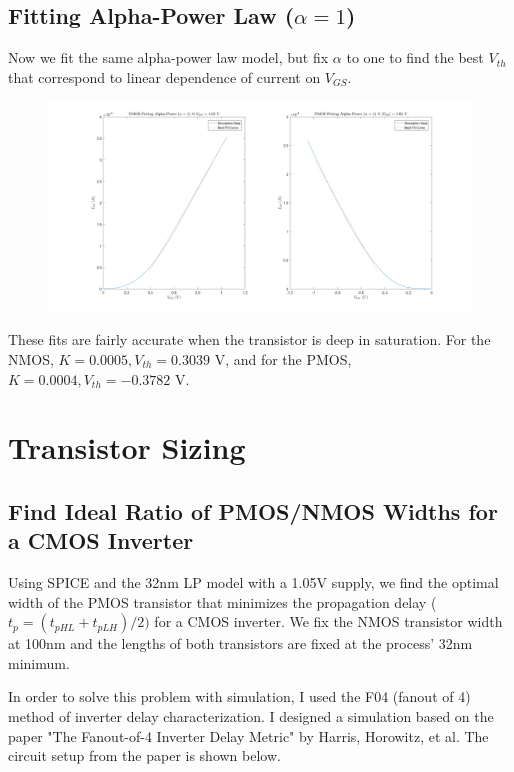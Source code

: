 \documentclass[11pt]{article}
\begin{document}
\subsection{Fitting Alpha-Power Law ($\alpha = 1$)}
Now we fit the same alpha-power law model, but fix $\alpha$ to one to find the best $V_{th}$ that correspond to linear dependence of current on $V_{GS}$.

\begin{figure}[H]
	\centerline{\includegraphics[width=\textwidth]{images/alpha_power_fit_alpha1.png}}
\end{figure}

These fits are fairly accurate when the transistor is deep in saturation. For the NMOS, $K = 0.0005, V_{th} = 0.3039 \text{ V}$, and for the PMOS, $K = 0.0004, V_{th} = -0.3782 \text{ V}$.

\section{Transistor Sizing}

\subsection{Find Ideal Ratio of PMOS/NMOS Widths for a CMOS Inverter}
Using SPICE and the 32nm LP model with a 1.05V supply, we find the optimal width of the PMOS transistor that minimizes the propagation delay ($t_{p} = (t_{pHL} + t_{pLH}) / 2)$ for a CMOS inverter. We fix the NMOS transistor width at 100nm and the lengths of both transistors are fixed at the process' 32nm minimum.

In order to solve this problem with simulation, I used the F04 (fanout of 4) method of inverter delay characterization. I designed a simulation based on the paper "The Fanout-of-4 Inverter Delay Metric" by Harris, Horowitz, et al. The circuit setup from the paper is shown below.
\end{document}

